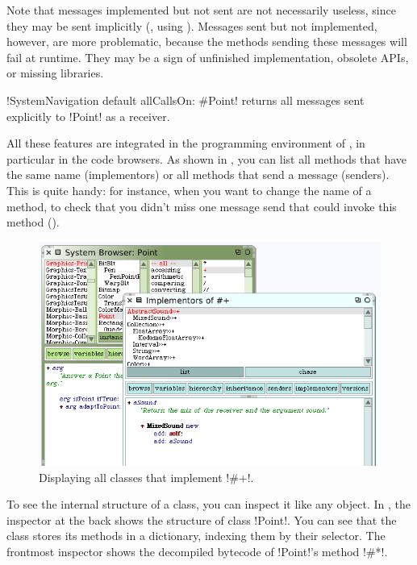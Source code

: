 \documentclass[a4paper,10pt,twoside]{book}
\begin{document}
Note that messages implemented but not sent are not necessarily useless, since they may be sent implicitly (\eg, using ).
Messages sent but not implemented, however, are more problematic, because the methods sending these messages will fail at runtime.
They may be a sign of unfinished implementation, obsolete APIs, or missing libraries.







\ct!SystemNavigation default allCallsOn: #Point! returns all messages sent explicitly to \ct!Point! as a receiver.



All these features are integrated in the programming environment of \squeak, in particular in the code browsers.
As shown in , you can list all methods that have the same name (implementors) or all methods that send a message (senders).
This is quite handy: for instance, when you want to change the name of a method, to check that you didn't miss one message send that could invoke this method (). 

\begin{figure}[ht]\centering
	\includegraphics[width=.75\linewidth]{implementors}
	\caption{Displaying all classes that implement \ct!\#+!.\label{fig:implementors}}
\end{figure}

To see the internal structure of a class, you can inspect it like any object.
In , the inspector at the back shows the structure of class \ct!Point!.
You can see that the class stores its methods in a dictionary, indexing them by their selector.
The frontmost inspector shows the decompiled bytecode of \ct!Point!'s method \ct!#*!.
\end{document}

